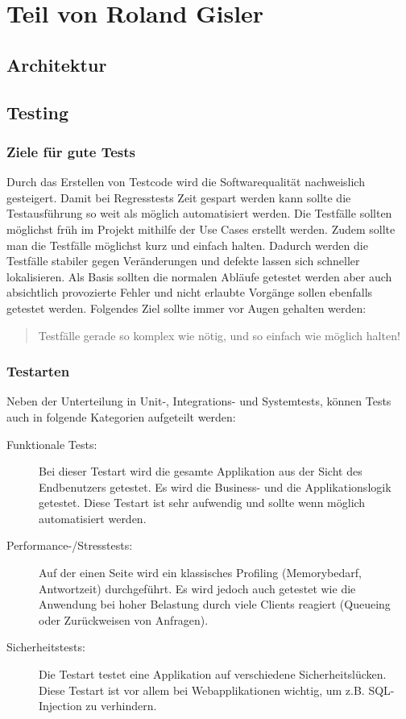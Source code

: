 \chapter{Teil von Roland Gisler}

\section{Architektur}

\section{Testing}

\subsection{Ziele für gute Tests}

Durch das Erstellen von Testcode wird die Softwarequalität nachweislich gesteigert. Damit bei Regresstests Zeit gespart werden kann sollte die Testausführung so weit als möglich automatisiert werden. Die Testfälle sollten möglichst früh im Projekt mithilfe der Use Cases erstellt werden. Zudem sollte man die Testfälle möglichst kurz und einfach halten. Dadurch werden die Testfälle stabiler gegen Veränderungen und defekte lassen sich schneller lokalisieren. Als Basis sollten die normalen Abläufe getestet werden aber auch absichtlich provozierte Fehler und nicht erlaubte Vorgänge sollen ebenfalls getestet werden. Folgendes Ziel sollte immer vor Augen gehalten werden:
\begin{quote}
Testfälle gerade so komplex wie nötig, und so einfach wie möglich halten!
\end{quote}

\subsection{Testarten}

Neben der Unterteilung in Unit-, Integrations- und Systemtests, können Tests auch in folgende Kategorien aufgeteilt werden:
\begin{description}
	\item[Funktionale Tests:] Bei dieser Testart wird die gesamte Applikation aus der Sicht des Endbenutzers getestet. Es wird die Business- und die Applikationslogik getestet. Diese Testart ist sehr aufwendig und sollte wenn möglich automatisiert werden. 
	\item[Performance-/Stresstests:] Auf der einen Seite wird ein klassisches Profiling (Memorybedarf, Antwortzeit) durchgeführt. Es wird jedoch auch getestet wie die Anwendung bei hoher Belastung durch viele Clients reagiert (Queueing oder Zurückweisen von Anfragen).
	\item[Sicherheitstests:] Die Testart testet eine Applikation auf verschiedene Sicherheitslücken. Diese Testart ist vor allem bei Webapplikationen wichtig, um z.B. SQL-Injection zu verhindern.   
\end{description}

